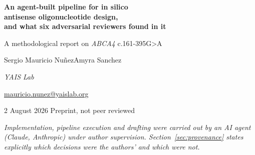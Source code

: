 \documentclass[11pt,a4paper]{article}
\begin{document}
\thispagestyle{empty}
\begin{center}
  \vspace*{0.6cm}

  {\LARGE\bfseries An agent-built pipeline for in silico\\[0.15em]
   antisense oligonucleotide design,\\[0.25em]
   and what six adversarial reviewers found in it\par}

  \vspace{0.8em}
  {\large A methodological report on \emph{ABCA4} c.161-395G>A\par}

  \vspace{1.6em}
  {\large Sergio Mauricio Nu\~nez\qquad Amyra Sanchez\par}
  \vspace{0.4em}
  {\small \emph{YAIS Lab}\par}
  \vspace{0.2em}
  {\small \href{mailto:mauricio.nunez@yaislab.org}{mauricio.nunez@yaislab.org}\par}

  \vspace{0.9em}
  {\small 2 August 2026 \quad\textbullet\quad Preprint, not peer reviewed\par}
\end{center}

\vspace{0.8em}

\begin{center}
\begin{minipage}{0.88\linewidth}\small\itshape
Implementation, pipeline execution and drafting were carried out by an AI agent
(Claude, Anthropic) under author supervision. Section~\ref{sec:provenance} states
explicitly which decisions were the authors' and which were not.
\end{minipage}
\end{center}

\vspace{1.2em}
\end{document}
